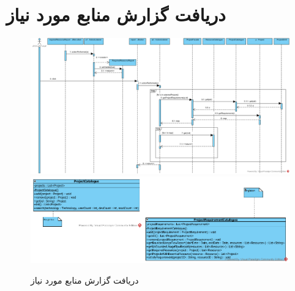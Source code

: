 \section{دریافت گزارش منابع مورد نیاز}
\begin{figure}[H]
	\centering
	\includegraphics[scale=0.7]{img/sequence-design/RequiredResourcesReport}
	\includegraphics[scale=0.7]{img/sequence-design/RequiredResourcesReportC}
	\caption{دریافت گزارش منابع مورد نیاز}
\end{figure}

